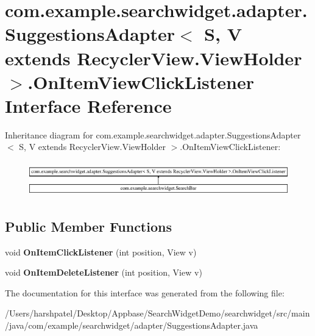 \hypertarget{interfacecom_1_1example_1_1searchwidget_1_1adapter_1_1_suggestions_adapter_1_1_on_item_view_click_listener}{}\section{com.\+example.\+searchwidget.\+adapter.\+Suggestions\+Adapter$<$ S, V extends Recycler\+View.\+View\+Holder $>$.On\+Item\+View\+Click\+Listener Interface Reference}
\label{interfacecom_1_1example_1_1searchwidget_1_1adapter_1_1_suggestions_adapter_1_1_on_item_view_click_listener}
Inheritance diagram for com.\+example.\+searchwidget.\+adapter.\+Suggestions\+Adapter$<$ S, V extends Recycler\+View.\+View\+Holder $>$.On\+Item\+View\+Click\+Listener\+:\begin{figure}[H]
\begin{center}
\leavevmode
\includegraphics[height=1.530055cm]{interfacecom_1_1example_1_1searchwidget_1_1adapter_1_1_suggestions_adapter_1_1_on_item_view_click_listener}
\end{center}
\end{figure}
\subsection*{Public Member Functions}
\begin{DoxyCompactItemize}
\item 
\mbox{\label{interfacecom_1_1example_1_1searchwidget_1_1adapter_1_1_suggestions_adapter_1_1_on_item_view_click_listener_aa0d42ca45d0bbaaa2b7c49fdf9366bb8}} 
void {\bfseries On\+Item\+Click\+Listener} (int position, View v)
\item 
\mbox{\label{interfacecom_1_1example_1_1searchwidget_1_1adapter_1_1_suggestions_adapter_1_1_on_item_view_click_listener_a4edf1e9e364a9069cff26e3c978f505f}} 
void {\bfseries On\+Item\+Delete\+Listener} (int position, View v)
\end{DoxyCompactItemize}


The documentation for this interface was generated from the following file\+:\begin{DoxyCompactItemize}
\item 
/\+Users/harshpatel/\+Desktop/\+Appbase/\+Search\+Widget\+Demo/searchwidget/src/main/java/com/example/searchwidget/adapter/Suggestions\+Adapter.\+java\end{DoxyCompactItemize}
